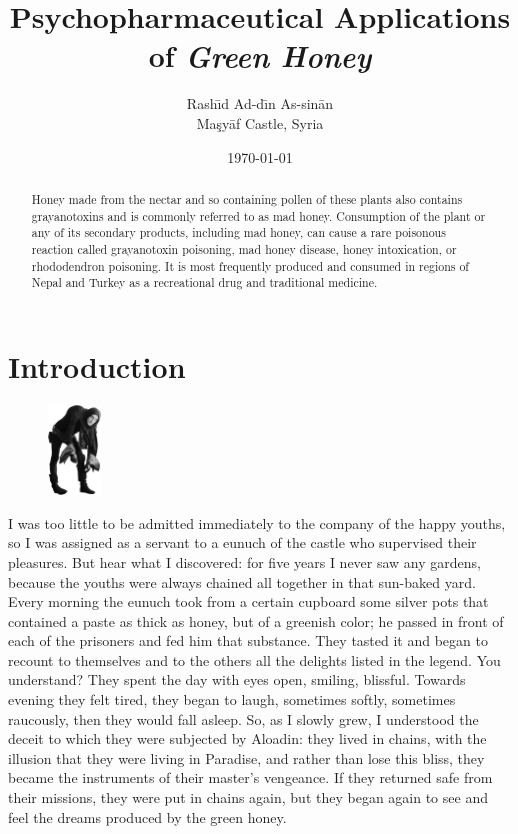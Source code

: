 \documentclass[11pt]{article}
\title{Psychopharmaceutical Applications of \emph{Green Honey}}
\author{Rash\={\i}d Ad-d\={\i}n As-sin\={a}n \\ Ma\c{s}y\={a}f Castle, Syria}
\date{\today}
\begin{document}
\maketitle

\begin{abstract}
Honey made from the nectar and so containing pollen of
these plants also contains grayanotoxins and is commonly
referred to as mad honey. Consumption of the plant or
any of its secondary products, including mad honey, can
cause a rare poisonous reaction called grayanotoxin
poisoning, mad honey disease, honey intoxication, or
rhododendron poisoning. It is most frequently produced
and consumed in regions of Nepal and Turkey as a recreational
drug and traditional medicine.
\end{abstract}

\section{Introduction}\label{ss:intro}
\begin{figure}
  \begin{center}
\includegraphics[width=0.125\textwidth]{images/marty-igor.png}
  \end{center}
\end{figure}
I was too little to be admitted immediately to the company of the
happy youths, so I was assigned as a servant to a eunuch of the
castle who supervised their pleasures. But hear what I discovered:
for five years I never saw any gardens, because the youths were
always chained all together in that sun-baked yard. Every morning
the eunuch took from a certain cupboard some silver pots that
contained a paste as thick as honey, but of a greenish color; he
passed in front of each of the prisoners and fed him that substance.
They tasted it and began to recount to themselves and to the others
all the delights listed in the legend. You understand? They spent
the day with eyes open, smiling, blissful.  Towards evening they
felt tired, they began to laugh, sometimes softly, sometimes
raucously, then they would fall asleep. So, as I slowly grew, I
understood the deceit to which they were subjected by Aloadin: they
lived in chains, with the illusion that they were living in Paradise,
and rather than lose this bliss, they became the instruments of
their master's vengeance. If they returned safe from their missions,
they were put in chains again, but they began again to see and feel
the dreams produced by the green honey.
\end{document}
